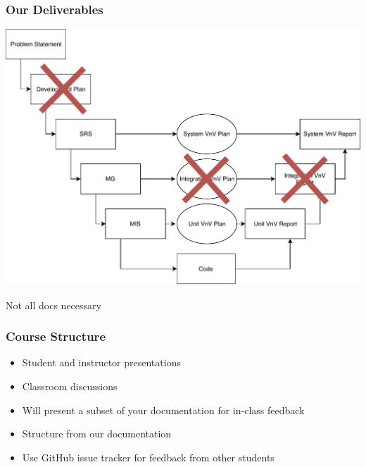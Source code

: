 \documentclass[t,12pt,numbers,fleqn]{beamer}
\begin{document}

\begin{frame}

\frametitle{Our Deliverables}

\begin{center}
\includegraphics[scale=0.55]{../Figures/VModelOfProcessXOut.pdf}
\end{center}
\vspace{-1.0cm}
Not all docs necessary

\end{frame}


\begin{frame}
\frametitle{Course Structure}

\begin {itemize}

\item Student and instructor presentations
\item Classroom discussions
\item Will present a subset of your documentation for in-class feedback
\item Structure from our documentation
\item Use GitHub issue tracker for feedback from other students

\end {itemize}

\end{frame}

\end{document}
